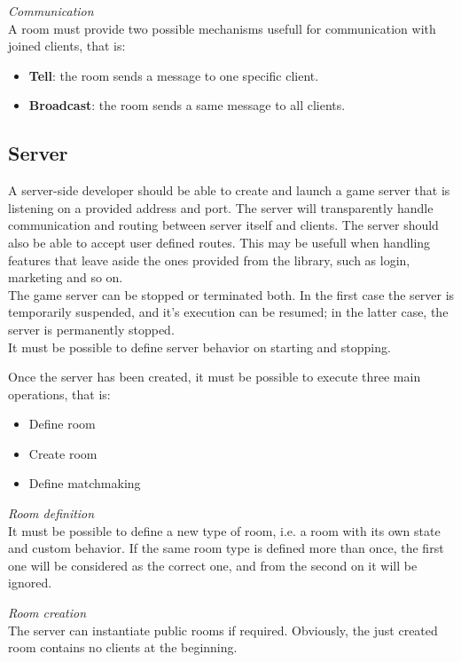 \bigskip
\textit{Communication}
\\
A room must provide two possible mechanisms usefull for communication with joined clients, that is:
\begin{itemize}
\item \textbf{Tell}: the room sends a message to one specific client.
\item \textbf{Broadcast}: the room sends a same message to all clients. 
\end{itemize} 


\subsection{Server}

A server-side developer should be able to create and launch a game server that is listening on a provided address and port. The server will transparently handle communication and routing between server itself and clients. The server should also be able to accept user defined routes. This may be usefull when handling features that leave aside the ones provided from the library, such as login, marketing and so on.
\\
The game server can be stopped or terminated both. In the first case the server is temporarily suspended, and it's execution can be resumed; in the latter case, the server is permanently stopped.
\\
It must be possible to define server behavior on starting and stopping.

\bigskip
Once the server has been created, it must be possible to execute three main operations, that is:
\begin{itemize}
\item Define room
\item Create room
\item Define matchmaking 
\end{itemize}

\bigskip
\textit{Room definition}
\\
It must be possible to define a new type of room, i.e. a room with its own state and custom behavior.
If the same room type is defined more than once, the first one will be considered as the correct one, and from the second on it will be ignored.

\bigskip
\textit{Room creation}
\\
The server can instantiate public rooms if required. Obviously, the just created room contains no clients at the beginning.


